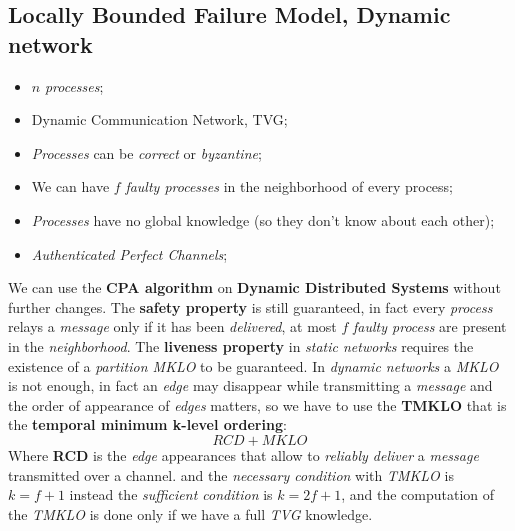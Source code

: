 \documentclass{article}
\begin{document}
\subsection{Locally Bounded Failure Model, Dynamic network}
\begin{itemize}
\item $n$ \emph{processes};
\item Dynamic Communication Network, TVG;
\item \emph{Processes} can be \emph{correct} or \emph{byzantine};
\item We can have $f$ \emph{faulty processes} in the neighborhood of every process;
\item \emph{Processes} have no global knowledge (so they don't know about each other);
\item \emph{Authenticated Perfect Channels};
\end{itemize}
We can use the \textbf{CPA algorithm} on \textbf{Dynamic Distributed Systems} without further changes. The \textbf{safety property} is still guaranteed, in fact every \emph{process} relays a \emph{message} only if it has been \emph{delivered}, at most $f$ \emph{faulty process} are present in the \emph{neighborhood}. The \textbf{liveness property} in \emph{static networks} requires the existence of a \emph{partition MKLO} to be guaranteed. In \emph{dynamic networks} a \emph{MKLO} is not enough, in fact an \emph{edge} may disappear while transmitting a \emph{message} and the order of appearance of \emph{edges} matters, so we have to use the \textbf{TMKLO} that is the \textbf{temporal minimum k-level ordering}:
\[ RCD + MKLO \]
Where \textbf{RCD} is the \emph{edge} appearances that allow to \emph{reliably deliver} a \emph{message} transmitted over a channel. and the \emph{necessary condition} with \emph{TMKLO} is $k=f+1$ instead the \emph{sufficient condition} is $k=2f+1$, and the computation of the \emph{TMKLO} is done only if we have a full \emph{TVG} knowledge. 
\end{document}
